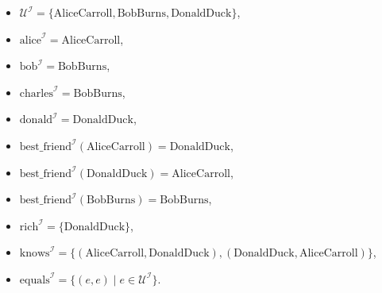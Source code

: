 \documentclass[solution]{acAssignment}
\begin{document}
\begin{itemize}
    \item $\mathcal{U}^\mathcal{I} = \{\mathrm{AliceCarroll}, \mathrm{BobBurns}, \mathrm{DonaldDuck}\}$,
    \item $\mathrm{alice}^\mathcal{I} = \mathrm{AliceCarroll}$,
    \item $\mathrm{bob}^\mathcal{I} = \mathrm{BobBurns}$,
    \item $\mathrm{charles}^\mathcal{I} = \mathrm{BobBurns}$,
    \item $\mathrm{donald}^\mathcal{I} = \mathrm{DonaldDuck}$,
    \item $\mathrm{best\_friend}^\mathcal{I}(\mathrm{AliceCarroll}) = \mathrm{DonaldDuck}$,
    \item $\mathrm{best\_friend}^\mathcal{I}(\mathrm{DonaldDuck}) = \mathrm{AliceCarroll}$,
    \item $\mathrm{best\_friend}^\mathcal{I}(\mathrm{BobBurns}) = \mathrm{BobBurns}$,
    \item $\mathrm{rich}^\mathcal{I} = \{\mathrm{DonaldDuck}\}$,
    \item $\mathrm{knows}^\mathcal{I} = \{(\mathrm{AliceCarroll}, \mathrm{DonaldDuck}), (\mathrm{DonaldDuck}, \mathrm{AliceCarroll})\}$,
    \item $\mathrm{equals}^\mathcal{I} = \{(e, e) \mid e \in \mathcal{U}^\mathcal{I}\}$.
\end{itemize}
    
\end{document}
